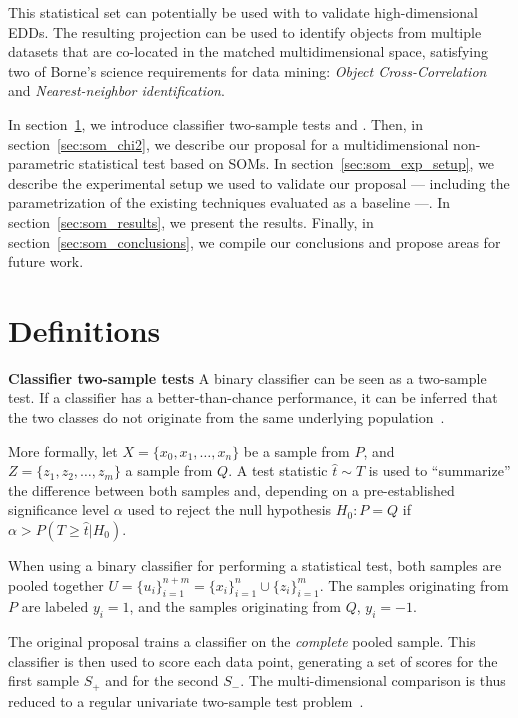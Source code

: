 This statistical set can potentially be used with \PresQ to validate
high-dimensional \glspl{EDD}. The resulting projection can be used to identify objects
from multiple datasets that are co-located in the matched multidimensional space, satisfying
two of Borne's science requirements for data mining: \emph{Object Cross-Correlation} and
\emph{Nearest-neighbor identification}.

In section~\ref{sec:som_definitions}, we introduce classifier two-sample tests
and . Then, in section~\ref{sec:som_chi2}, we describe our proposal
for a multidimensional non-parametric statistical test based on \glspl{SOM}.
In section~\ref{sec:som_exp_setup}, we describe the experimental setup we used
to validate our proposal --- including the parametrization of the existing techniques
evaluated as a baseline ---. In section~\ref{sec:som_results}, we present the 
results.
Finally, in section~\ref{sec:som_conclusions}, we compile our conclusions and 
propose areas for future work.


\section{Definitions}
\label{sec:som_definitions}

\textbf{Classifier two-sample tests}
\label{sec:som_classifier2sample}
A binary classifier can be seen as a two-sample test. If a classifier has a better-than-chance
performance, it can be inferred that the two classes do not originate from the same underlying
population~\cite{friedman2004multivariate}. 

More formally, let $X = \{x_0,x_1,\ldots,x_n\}$  be a sample from $P$, and \linebreak
$Z = \{z_1,z_2,\ldots,z_m\}$ a sample from $Q$. A test statistic $\hat t \sim T$ is used to
``summarize'' the difference between both samples and, depending on a pre-established
significance level $\alpha$ used to reject the null hypothesis
$H_0: P = Q$ if $\alpha > P(T \ge \hat t | H_0)$.

When using a binary classifier for performing a statistical test, both samples are pooled
together $U = \{u_i\}_{i=1}^{n+m} = \{x_i\}_{i=1}^n \cup \{z_i\}_{i=1}^m$.
The samples originating from $P$ are labeled $y_i=1$, and the samples originating
from $Q$, $y_i=-1$.

The original proposal trains a classifier on the \emph{complete} pooled sample.
This classifier is then used to score each data point, generating a set of scores
for the first sample $S_+$ and for the second $S_-$. The multi-dimensional comparison
is thus reduced to a regular univariate two-sample test problem~\cite{friedman2004multivariate}.

